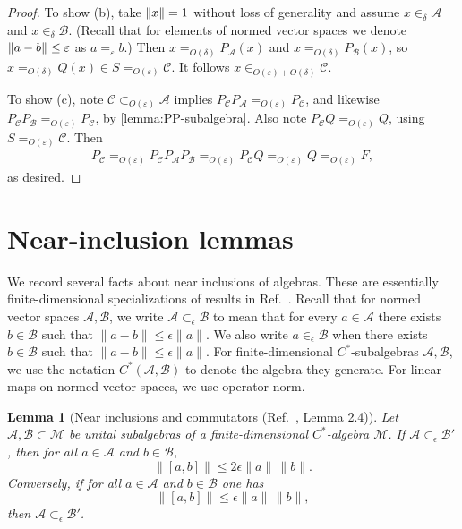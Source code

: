 \documentclass[11pt,reqno]{amsart}
\newtheorem{lemma}[theorem]{Lemma}
\theoremstyle{definition}
\theoremstyle{remark}
\numberwithin{equation}{section}
\newcommand{\eps}{\varepsilon}
\newcommand{\cA}{\mathcal A}
\newcommand{\cB}{\mathcal B}
\newcommand{\cC}{\mathcal C}
\DeclarePairedDelimiter\norm{\lVert}{\rVert}
\begin{document}
\begin{proof}
To show (b), take $\norm{x} = 1$ without loss of generality and assume $x\in_\delta \cA$ and $x\in_\delta \cB$. (Recall that for elements of normed vector spaces we denote $\norm{a-b} \le \eps$ as $a=_\eps b$.)
Then $x =_{O(\delta)} P_\cA(x)$ and  $x =_{O(\delta)} P_\cB(x)$, so  $x =_{O(\delta)} Q(x) \in S =_{O(\eps)} \cC$. It follows $x \in_{O(\eps) + O(\delta)} \cC.$

To show (c), note $\cC \subset_{O(\eps)} \cA$ implies $P_\cC P_\cA =_{O(\eps)} P_\cC$, and likewise $P_\cC P_\cB =_{O(\eps)} P_\cC$, by \cref{lemma:PP-subalgebra}.  Also note $P_\cC Q =_{O(\eps)} Q$, using $S =_{O(\eps)}  \cC$.  Then
\begin{align}
    P_\cC =_{O(\eps)} P_\cC P_\cA P_\cB =_{O(\eps)} P_\cC Q =_{O(\eps)} Q =_{O(\eps)} F,
\end{align}
as desired.
\end{proof}

\appendix
{}

\section{Near-inclusion lemmas}\label{app:near-inclusion-lemmas}
We record several facts about near inclusions of algebras. These are essentially finite-dimensional specializations of results in Ref.~\cite{ranard2022converse}.
Recall that for normed vector spaces $\mathcal{A}, \mathcal{B}$, we write $\mathcal{A} \subset_\epsilon \mathcal{B}$ to mean that for every $a \in \mathcal{A}$ there exists $b \in \mathcal{B}$ such that $\|a-b\| \le \epsilon \|a\|.$
We also write $a \in_\epsilon \mathcal{B}$ when there exists $b \in \mathcal{B}$ such that $\|a-b\| \le \epsilon \|a\|.$  For finite-dimensional $C^*$-subalgebras $\cA, \cB$, we use the notation $C^*(\cA,\cB)$ to denote the algebra they generate.  For linear maps on normed vector spaces, we use operator norm.

\begin{lemma}[Near inclusions and commutators (Ref.~\cite{ranard2022converse}, Lemma 2.4)] \label{lemma:near-inclusion-commutators}
Let $\mathcal{A},\mathcal{B} \subset \mathcal{M}$ be unital subalgebras of a finite-dimensional $C^*$-algebra $\mathcal{M}$.
If $\mathcal{A} \subset_\epsilon \mathcal{B}'$, then for all $a \in \mathcal{A}$ and $b \in \mathcal{B}$,
\[
\|[a,b]\| \le 2\epsilon \|a\|\,\|b\|.
\]
Conversely, if for all $a \in \mathcal{A}$ and $b \in \mathcal{B}$ one has
\[
\|[a,b]\| \le \epsilon \|a\|\,\|b\|,
\]
then $\mathcal{A} \subset_\epsilon \mathcal{B}'$.
\end{lemma}
\end{document}
